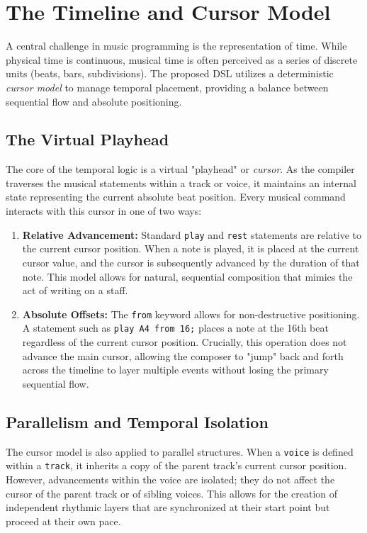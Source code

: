 \section{The Timeline and Cursor Model}\label{sec:temporal-logic}

A central challenge in music programming is the representation of time.
While physical time is continuous, musical time is often perceived as a series of discrete units (beats,
bars, subdivisions).
The proposed DSL utilizes a deterministic \textit{cursor model} to manage temporal placement, providing a
balance between sequential flow and absolute positioning.

\subsection{The Virtual Playhead}

The core of the temporal logic is a virtual "playhead" or \textit{cursor}.
As the compiler traverses the musical statements within a track or voice, it maintains an internal state
representing the current absolute beat position.
Every musical command interacts with this cursor in one of two ways:

\begin{enumerate}
  \item \textbf{Relative Advancement:} Standard \texttt{play} and \texttt{rest} statements are relative to
    the current cursor position. When a note is played, it is placed at the current cursor value, and the
    cursor is subsequently advanced by the duration of that note. This model allows for natural, sequential
    composition that mimics the act of writing on a staff.
  \item \textbf{Absolute Offsets:} The \texttt{from} keyword allows for non-destructive positioning. A
    statement such as \texttt{play A4 from 16;} places a note at the 16th beat regardless of the current
    cursor position. Crucially, this operation does not advance the main cursor, allowing the composer to
    "jump" back and forth across the timeline to layer multiple events without losing the primary sequential flow.
\end{enumerate}

\subsection{Parallelism and Temporal Isolation}

The cursor model is also applied to parallel structures.
When a \texttt{voice} is defined within a \texttt{track}, it inherits a copy of the parent track's current
cursor position.
However, advancements within the voice are isolated; they do not affect the cursor of the parent track or of
sibling voices.
This allows for the creation of independent rhythmic layers that are synchronized at their start point but
proceed at their own pace.

